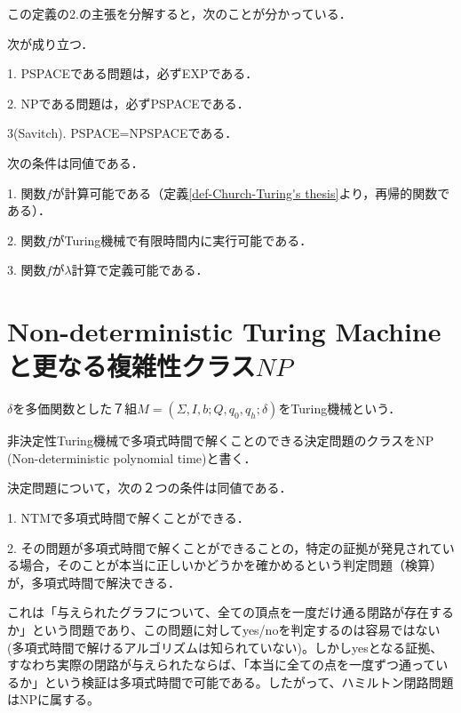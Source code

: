 \documentclass[uplatex, 12pt, dvipdfmx]{jsreport}
\begin{document}
この定義の2.の主張を分解すると，次のことが分かっている．
\begin{proposition}次が成り立つ．

    1. PSPACEである問題は，必ずEXPである．

    2. NPである問題は，必ずPSPACEである．

    3(Savitch). PSPACE=NPSPACEである． 
\end{proposition}

\begin{proposition}\label{prop-computability}
    次の条件は同値である．

    1. 関数$f$が計算可能である（定義\ref{def-Church-Turing's thesis}より，再帰的関数である）．

    2. 関数$f$がTuring機械で有限時間内に実行可能である．

    3. 関数$f$が$\lambda$計算で定義可能である．
\end{proposition}

\section{Non-deterministic Turing Machineと更なる複雑性クラス$NP$}
\begin{definition}[非決定性チューリングマシン]
    $\delta$を多価関数とした７組$M=(\Sigma,I,b;Q,q_0,q_h;\delta)$をTuring機械という．
\end{definition}

\begin{definition}[判定問題の複雑性クラス２：NP]
    非決定性Turing機械で多項式時間で解くことのできる決定問題のクラスを$\mathrm{NP}$(Non-deterministic polynomial time)と書く．
\end{definition}
\begin{proposition}[NPの特徴付け]
    決定問題について，次の２つの条件は同値である．

    1. NTMで多項式時間で解くことができる．

    2. その問題が多項式時間で解くことができることの，特定の証拠が発見されている場合，そのことが本当に正しいかどうかを確かめるという判定問題（検算）が，多項式時間で解決できる．
\end{proposition}
\begin{example}[Hamilton経路問題]
    これは「与えられたグラフについて、全ての頂点を一度だけ通る閉路が存在するか」という問題であり、この問題に対してyes/noを判定するのは容易ではない(多項式時間で解けるアルゴリズムは知られていない)。しかしyesとなる証拠、すなわち実際の閉路が与えられたならば、「本当に全ての点を一度ずつ通っているか」という検証は多項式時間で可能である。したがって、ハミルトン閉路問題はNPに属する。
\end{example}
\end{document}
